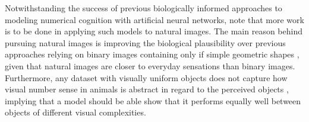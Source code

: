 \documentclass[twocolumn]{article}
\begin{document}
Notwithstanding the success of previous biologically informed approaches to modeling numerical cognition with artificial neural networks, \citet{stoianov2012} note that more work is to be done in applying such models to natural images. The main reason behind pursuing natural images is improving the biological plausibility over previous approaches relying on binary images containing only if simple geometric shapes \citep[for examples, see][]{stoianov2012, wu2018two, peterson2000computational}, given that natural images are closer to everyday sensations than binary images. Furthermore, any dataset with visually uniform objects does not capture how visual number sense in animals is abstract in regard to the perceived objects \citep{nieder2016neuronal}, implying that a model should be able show that it performs equally well between objects of different visual complexities.
\end{document}
